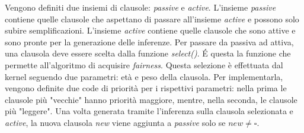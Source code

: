 Vengono definiti due insiemi di clausole: \emph{passive} e \emph{active}.
L'insieme \emph{passive} contiene quelle clausole che aspettano di passare all'insieme \emph{active} e possono solo 
subire semplificazioni. L'insieme \emph{active} contiene quelle clausole che sono attive e sono pronte per 
la generazione delle inferenze. Per passare da passiva ad attiva, una clausola deve essere scelta dalla funzione \emph{select()}.
\'E questa la funzione che permette all'algoritmo di acquisire \emph{fairness}. Questa selezione è effettuata 
dal kernel seguendo due parametri: età e peso della clausola. Per implementarla, vengono definite due code di priorità per i rispettivi parametri:
nella prima le clausole più "vecchie" hanno priorità maggiore, mentre, nella seconda, le clausole più "leggere". 
Una volta generata tramite l'inferenza sulla clausola selezionata e \emph{active}, la nuova clausola \emph{new} viene aggiunta a \emph{passive} solo se $new\neq\square$.
